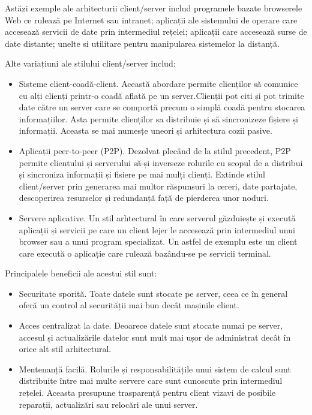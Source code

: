 \documentclass[12pt, a4paper, oneside, romanian]{teza-upb}
\begin{document}
Astăzi exemple ale arhitecturii client/server includ programele bazate browserele Web ce rulează pe Internet sau intranet; aplicații ale sistemului de operare care accesează servicii de date prin intermediul rețelei; aplicații care accesează surse de date distante; unelte si utilitare pentru manipularea sistemelor la distanță.

Alte variațiuni ale stilului client/server includ:

\begin{itemize}
 \item Sisteme client-coadă-client. Această abordare permite clienților să comunice cu alți clienți printr-o coadă aflată pe un server.Clienții pot citi și pot trimite date către un server care se comportă precum o simplă coadă pentru stocarea informațiilor. Asta permite clienților sa distribuie și să sincronizeze fișiere și informații. Aceasta se mai numesțe uneori și arhitectura cozii pasive.
 \item Aplicații peer-to-peer (P2P). Dezolvat plecând de la stilul precedent, P2P permite clientului și serverului să-și inverseze rolurile cu scopul de a distribui și sincroniza informații și fisiere pe mai mulți clienți. Extinde stilul client/server prin generarea mai multor răspunsuri la cereri, date partajate, descoperirea resurselor și redundanță față de pierderea unor noduri.
 \item Servere aplicative. Un stil arhtectural în care serverul găzduiește și execută aplicații și servicii pe care un client lejer le accesează prin intermediul unui browser sau a unui program specializat. Un astfel de exemplu este un client care execută o aplicație care rulează bazându-se pe servicii terminal.
\end{itemize}

Principalele beneficii ale acestui stil sunt:
\begin{itemize}
	\item Securitate sporită. Toate datele sunt stocate pe server, ceea ce în general oferă un control al securității mai bun decât mașinile client.
	\item Acces centralizat la date. Deoarece datele sunt stocate numai pe server, accesul și actualizările datelor sunt mult mai ușor de administrat decât în orice alt stil arhitectural.
	\item Mentenanță facilă. Rolurile și responsabilitățile unui sistem de calcul sunt distribuite între mai multe servere care sunt cunoscute prin intermediul rețelei. Aceasta presupune trasparență pentru client vizavi de posibile reparații, actualizări sau relocări ale unui server.
\end{itemize}
\end{document}
